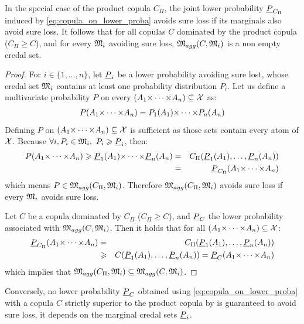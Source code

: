 In the special case of the product copula $C_\Pi$, the joint lower probability ${\underline{P}}_{C_\Pi}$ induced by \eqref{eq:copula_on_lower_proba} avoids sure loss if its marginals also avoid sure loss. It follows that for all copulas $C$ dominated by the product copula (\ie $C_\Pi\geqslant C$), and for every ${\mathfrak{M}}_i$ avoiding sure loss, ${\mathfrak{M}}_{agg}(C, {\mathfrak{M}}_i)$ is a non empty credal set.
\begin{proof}
    For $i\in\{1,\dots,n\}$, let ${\underline{P}}_i$ be a lower probability avoiding sure lost, \ie whose credal set ${\mathfrak{M}}_i$ contains at least one probability distribution $P_i$. Let us define a multivariate probability $P$ on every $(A_1{\times\dots\times} A_n)\subseteq{\mathcal{X}}$ as:
    \begin{eqnarray*}
        P(A_1{\times\dots\times} A_n) = P_1(A_1){\times\dots\times} P_n(A_n)
    \end{eqnarray*}
    Defining $P$ on $(A_1{\times\dots\times} A_n)\subseteq{\mathcal{X}}$ is sufficient as those sets contain every atom of ${\mathcal{X}}$.
    Because $\forall i, P_i\in{\mathfrak{M}}_i,~P_i\geqslant {\underline{P}}_i$, then:
    \begin{eqnarray*}
        P(A_1{\times\dots\times} A_n) \geqslant {\underline{P}}_1(A_1){\times\dots\times} {\underline{P}}_n(A_n) &=& C_\Pi({\underline{P}}_1(A_1), \dots, {\underline{P}}_n(A_n))\\
        &=& {\underline{P}}_{C_\Pi}(A_1{\times\dots\times} A_n)
    \end{eqnarray*}
which means $P\in{\mathfrak{M}}_{agg}(C_\Pi, {\mathfrak{M}}_i)$. Therefore ${\mathfrak{M}}_{agg}(C_\Pi, {\mathfrak{M}}_i)$ avoids sure loss if every ${\mathfrak{M}}_i$ avoids sure loss.

Let $C$ be a copula dominated by $C_\Pi$ (\ie $C_\Pi\geqslant C$), and ${\underline{P}}_C$ the lower probability associated with ${\mathfrak{M}}_{agg}(C, {\mathfrak{M}}_i)$. Then it holds that for all $(A_1{\times\dots\times} A_n)\subseteq{\mathcal{X}}$:
\begin{eqnarray*}
{\underline{P}}_{C_\Pi}(A_1{\times\dots\times} A_n)&=&C_\Pi({\underline{P}}_1(A_1), \dots, {\underline{P}}_n(A_n)) \\
    &\geqslant& C({\underline{P}}_1(A_1),\dots, {\underline{P}}_n(A_n)) = {\underline{P}}_C(A_1{\times\dots\times} A_n)
\end{eqnarray*}
which implies that ${\mathfrak{M}}_{agg}(C_\Pi, {\mathfrak{M}}_i)\subseteq {\mathfrak{M}}_{agg}(C, {\mathfrak{M}}_i)$.
\end{proof}

Conversely, no lower probability ${\underline{P}}_C$ obtained using \eqref{eq:copula_on_lower_proba} with a copula $C$ strictly superior to the product copula by is guaranteed to avoid sure loss, it depends on the marginal credal sets ${\underline{P}}_i$.

